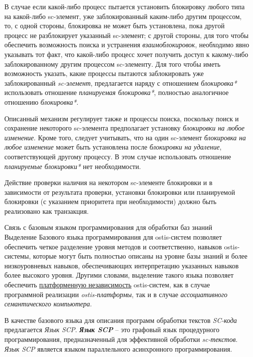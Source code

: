 \begin{frame}{}
В случае если какой-либо процесс пытается установить блокировку любого типа на какой-либо sc-элемент, уже заблокированный каким-либо другим процессом, то, с одной стороны, блокировка не может быть установлена, пока другой процесс не разблокирует указанный sc-элемент; с другой стороны, для того чтобы обеспечить возможность поиска и устранения \textit{взаимоблокировок}, необходимо явно указывать тот факт, что какой-либо процесс хочет получить доступ к какому-либо заблокированному другим процессом sc-элементу. Для того чтобы иметь возможность указать, какие процессы пытаются заблокировать уже заблокированный \textit{sc-элемент}, предлагается наряду с отношением \textit{блокировка*} использовать отношение \textit{планируемая блокировка*}, полностью аналогичное отношению \textit{блокировка*}.
\end{frame}

\begin{frame}{}
Описанный механизм регулирует также и процессы поиска, поскольку поиск и сохранение некоторого sc-элемента предполагает установку \textit{блокировки на любое изменение}. Кроме того, следует учитывать, что на один sc-элемент \textit{блокировка на любое изменение} может быть установлена после \textit{блокировки на удаление}, соответствующей другому процессу. В этом случае использовать отношение \textit{планируемые блокировки*} нет необходимости.
	
Действие проверки наличия на некотором sc-элементе блокировки и в зависимости от результата проверки, установки блокировки или планируемой блокировки (с указанием приоритета при необходимости) должно быть реализовано как транзакция.
\end{frame}

\begin{frame}{Связь с базовым языком программирования для обработки баз знаний}
\topline
\vspace{30pt}
 \\

    Выделение Базового языка программирования для ostis-систем позволяет обеспечить четкое разделение уровня методов и соответственно, навыков ostis-системы, которые могут быть полностью описаны на уровне базы знаний и более низкоуровневых навыков, обеспечивающих интерпретацию указанных навыков более высокого уровня. Другими словами, выделение такого языка позволяет обеспечить \uline{платформенную независимость} ostis-систем, как в случае программной реализации \textit{ostis-платформы}, так и в случае \textit{ассоциативного семантического компьютера}.
    \par В качестве базового языка для описания программ обработки текстов \textit{SC-кода} предлагается \textit{Язык SCP}. \textbf{\textit{Язык SCP}} -- это графовый язык процедурного программирования, предназначенный для эффективной обработки \textit{sc-текстов}. \textit{Язык SCP} является языком параллельного асинхронного программирования.
\end{frame}

